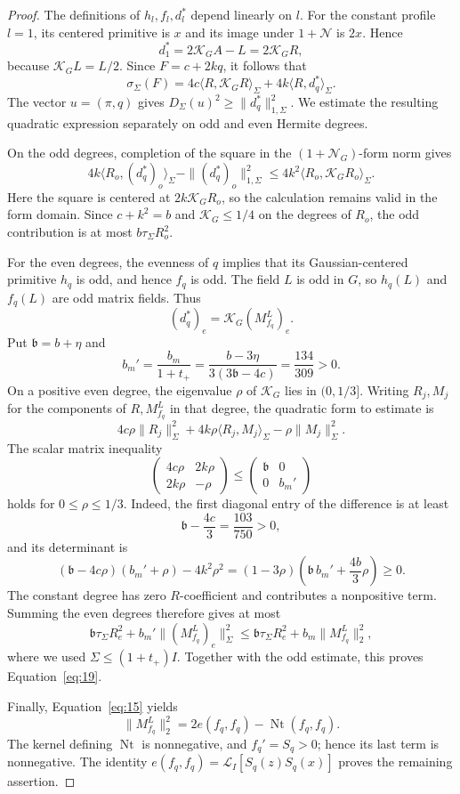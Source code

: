 \begin{proof}
The definitions of \(h_l,f_l,d_l^*\) depend linearly on \(l\).
For the constant profile \(l=1\), its centered primitive is \(x\)
and its image under \(1+\mathcal N\) is \(2x\).  Hence
\[
 d_1^*=2\mathcal K_G A-L=2\mathcal K_G R,
\]
because \(\mathcal K_G L=L/2\).
Since \(F=c+2kq\), it follows that
\[
 \sigma_\Sigma(F)
 =4c\langle R,\mathcal K_G R\rangle_\Sigma
       +4k\langle R,d_q^*\rangle_\Sigma.
\]
The vector \(u=(\pi,q)\) gives
\(D_\Sigma(u)^2\ge\|d_q^*\|_{1,\Sigma}^2\).
We estimate the resulting quadratic expression separately on odd
and even Hermite degrees.

On the odd degrees, completion of the square in the
\((1+\mathcal N_G)\)-form norm gives
\[
 4k\langle R_o,(d_q^*)_o\rangle_\Sigma
       -\|(d_q^*)_o\|_{1,\Sigma}^2
 \le 4k^2\langle R_o,\mathcal K_G R_o\rangle_\Sigma.
\]
Here the square is centered at \(2k\mathcal K_G R_o\), so the
calculation remains valid in the form domain.  Since
\(c+k^2=b\) and \(\mathcal K_G\le1/4\) on the degrees of \(R_o\),
the odd contribution is at most \(b\tau_\Sigma R_o^2\).

For the even degrees, the evenness of \(q\) implies that its
Gaussian-centered primitive \(h_q\) is odd, and hence \(f_q\) is
odd.  The field \(L\) is odd in \(G\), so \(h_q(L)\) and
\(f_q(L)\) are odd matrix fields.  Thus
\[
 (d_q^*)_e=\mathcal K_G(M_{f_q}^L)_e.
\]
Put \(\mathfrak b=b+\eta\) and
\[
 b_m'=\frac{b_m}{1+t_+}
      =\frac{b-3\eta}{3(3\mathfrak b-4c)}=\frac{134}{309}>0.
\]
On a positive even degree, the eigenvalue \(\rho\) of
\(\mathcal K_G\) lies in \((0,1/3]\).
Writing \(R_j,M_j\) for the components of \(R,M_{f_q}^L\) in that degree,
the quadratic form to estimate is
\[
 4c\rho\|R_j\|_\Sigma^2
       +4k\rho\langle R_j,M_j\rangle_\Sigma-\rho\|M_j\|_\Sigma^2.
\]
The scalar matrix inequality
\[
 \begin{pmatrix}4c\rho&2k\rho\\2k\rho&-\rho\end{pmatrix}
 \le
 \begin{pmatrix}\mathfrak b&0\\0&b_m'\end{pmatrix}
\]
holds for \(0\le\rho\le1/3\).  Indeed, the first diagonal entry
of the difference is at least
\[
 \mathfrak b-\frac{4c}{3}=\frac{103}{750}>0,
\]
and its determinant is
\[
 (\mathfrak b-4c\rho)(b_m'+\rho)-4k^2\rho^2
 =(1-3\rho)\left(\mathfrak b\,b_m'+\frac{4b}{3}\rho\right)\ge0.
\]
The constant degree has zero \(R\)-coefficient and contributes a
nonpositive term.  Summing the even degrees therefore gives at most
\[
 \mathfrak b\tau_\Sigma R_e^2
       +b_m'\|(M_{f_q}^L)_e\|_\Sigma^2
 \le \mathfrak b\tau_\Sigma R_e^2+b_m\|M_{f_q}^L\|_2^2,
\]
where we used \(\Sigma\le(1+t_+)I\).
Together with the odd estimate, this proves Equation~\eqref{eq:19}.

Finally, Equation~\eqref{eq:15} yields
\[
 \|M_{f_q}^L\|_2^2
 =2e(f_q,f_q)-\operatorname{Nt}(f_q,f_q).
\]
The kernel defining \(\operatorname{Nt}\) is nonnegative, and
\(f_q'=S_q>0\); hence its last term is nonnegative.
The identity \(e(f_q,f_q)=\mathcal L_I[S_q(z)S_q(x)]\)
proves the remaining assertion.
\end{proof}

